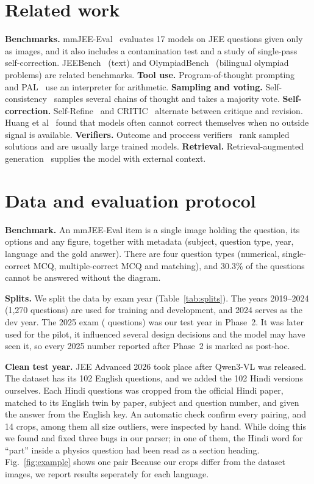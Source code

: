 \documentclass[conference]{IEEEtran}
\begin{document}
\section{Related work}
\textbf{Benchmarks.} mmJEE-Eval~\cite{mmjee} evaluates 17 models on JEE questions given only as
images, and it also includes a contamination test and a study of single-pass self-correction.
JEEBench~\cite{jeebench} (text) and OlympiadBench~\cite{olympiadbench} (bilingual olympiad
problems) are related benchmarks.
\textbf{Tool use.} Program-of-thought prompting~\cite{pot} and PAL~\cite{pal} use an interpreter for arithmetic.
\textbf{Sampling and voting.} Self-consistency~\cite{selfconsistency} samples several chains of
thought and takes a majority vote.
\textbf{Self-correction.} Self-Refine~\cite{selfrefine} and CRITIC~\cite{critic} alternate
between critique and revision. Huang et al~\cite{cannotselfcorrect} found that models often
cannot correct themselves when no outside signal is available.
\textbf{Verifiers.} Outcome and proccess verifiers~\cite{cobbe,lightman} rank sampled solutions and
are usually large trained models.
\textbf{Retrieval.} Retrieval-augmented generation~\cite{rag} supplies the model with external
context.

\section{Data and evaluation protocol}\label{sec:data}
\textbf{Benchmark.} An mmJEE-Eval item is a single image holding the question, its options and
any figure, together with metadata (subject, question type, year, language and the gold answer).
There are four question types (numerical, single-correct MCQ, multiple-correct MCQ and
matching), and 30.3\% of the questions cannot be answered without the diagram.

\textbf{Splits.} We split the data by exam year (Table~\ref{tab:splits}). The years 2019--2024
(1{,}270 questions) are used for training and development, and 2024 serves as the dev year. The
2025 exam (\NPost{} questions) was our test year in Phase~2. It was later used for the pilot,
it influenced several design decisions and the model may have seen it, so every 2025 number
reported after Phase~2 is marked as post-hoc.

\textbf{Clean test year.} JEE Advanced 2026 took place after Qwen3-VL was released. The dataset
has its 102 English questions, and we added the 102 Hindi versions ourselves. Each Hindi questions was cropped from the official Hindi paper, matched to its English twin by paper, subject and
question number, and given the answer from the English key. An automatic check confirm every pairing, and 14 crops, among them all size outliers, were inspected by hand. While doing this we
found and fixed three bugs in our parser; in one of them, the Hindi word for ``part'' inside a
physics question had been read as a section heading. Fig.~\ref{fig:example} shows one pair Because our crops differ from the dataset images, we report results seperately for each language.
\end{document}
